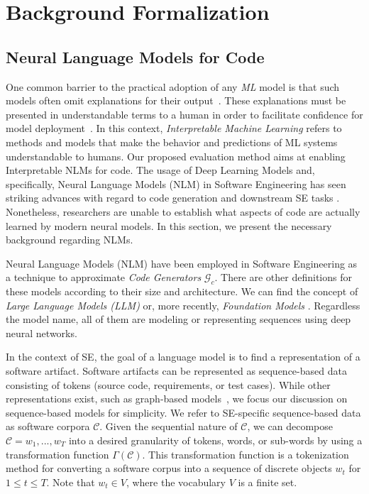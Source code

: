 \section{Background Formalization}

\subsection{Neural Language Models for Code}

One common barrier to the practical adoption of any \textit{ML} model is that such models often omit explanations for their output~\citep{molnar2019interpret}. These explanations must be presented in understandable terms to a human in order to facilitate confidence for model deployment~\citep{Doshi-Velez2018ConsiderationsLearning}. In this context, \textit{Interpretable Machine Learning} refers to methods and models that make the behavior and predictions of ML systems understandable to humans.  Our proposed \codeSeqRational evaluation method aims at enabling Interpretable NLMs for code. The usage of Deep Learning Models and, specifically, Neural Language Models (NLM) in Software Engineering has seen striking advances with regard to code generation and downstream SE tasks \citep{Chen2021EvaluatingCode, watson2020dl4se}. Nonetheless, researchers are unable to establish what aspects of code are actually learned by modern neural models. In this section, we present the necessary background regarding NLMs. 

Neural Language Models (NLM) have been employed in Software Engineering as a technique to approximate \textit{Code Generators} $\mathcal{G}_c$. There are other definitions for these models according to their size and architecture. We can find the concept of \textit{Large Language Models (LLM)} \citep{Bender2021OnBig} or, more recently, \textit{Foundation Models} \citep{Bommasani2021OnModels}. Regardless the model name, all of them are modeling or representing sequences using deep neural networks. 

In the context of SE, the goal of a language model is to find a representation of a software artifact. Software artifacts can be represented as sequence-based data consisting of tokens (\eg source code, requirements, or test cases). While other representations exist, such as graph-based models~\citep{allamanis2018learning}, we focus our discussion on sequence-based models for simplicity. We refer to SE-specific sequence-based data as software corpora $\mathcal{C}$. Given the sequential nature of $\mathcal{C}$, we can decompose $\mathcal{C} = w_1,...,w_T$ into a desired granularity of tokens, words, or sub-words \citep{Karampatsis2019} by using a transformation function $\Gamma(\mathcal{C})$. This transformation function is a tokenization method for converting a software corpus into a sequence of discrete objects $w_t$  for $1 \leqslant t \leqslant T$. Note that $w_t \in V$, where the vocabulary $V$ is a finite set. 

